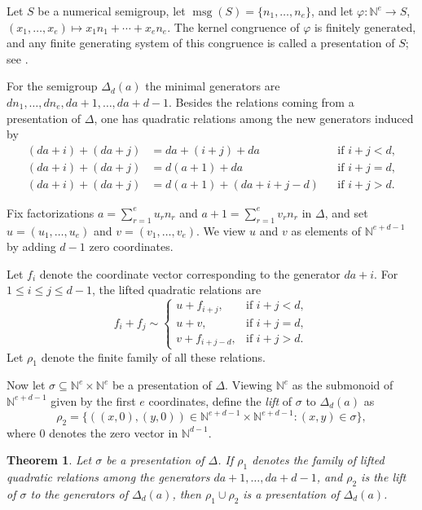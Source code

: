\documentclass[12pt,a4paper]{amsart}
\newtheorem{theorem}{Theorem}[section]
\theoremstyle{definition}
\theoremstyle{remark}
\begin{document}
Let $S$ be a numerical semigroup, let $\operatorname{msg}(S)=\{n_1,\dots,n_e\}$, and let
$\varphi:\mathbb{N}^e\to S$, $(x_1,\dots,x_e)\mapsto x_1n_1+\cdots+x_en_e$.
The kernel congruence of $\varphi$ is finitely generated, and any finite generating system of this congruence is called a presentation of $S$; see \cite[Chapter~7, Section~1]{book}.

For the semigroup $\Delta_d(a)$ the minimal generators are $dn_1,\dots,dn_e,da+1,\dots,da+d-1$.
Besides the relations coming from a presentation of $\Delta$, one has quadratic relations among the new generators induced by
\begin{align*}
(da+i)+(da+j)&=da+(i+j)+da &&\text{if } i+j<d,\\
(da+i)+(da+j)&=d(a+1)+da &&\text{if } i+j=d,\\
(da+i)+(da+j)&=d(a+1)+(da+i+j-d) &&\text{if } i+j>d.
\end{align*}

Fix factorizations $a=\sum_{r=1}^e u_r n_r$ and
$a+1=\sum_{r=1}^e v_r n_r$ in $\Delta$, and set
$u=(u_1,\dots,u_e)$ and $v=(v_1,\dots,v_e)$. We view \(u\) and \(v\) as elements
of \(\mathbb{N}^{e+d-1}\) by adding \(d-1\) zero coordinates.

Let \(f_i\) denote the coordinate vector corresponding to the generator \(da+i\).
For \(1\le i\le j\le d-1\), the lifted quadratic relations are
\[
f_i+f_j \sim
\begin{cases}
u+f_{i+j}, & \text{if } i+j<d,\\
u+v, & \text{if } i+j=d,\\
v+f_{i+j-d}, & \text{if } i+j>d.
\end{cases}
\]
Let \(\rho_1\) denote the finite family of all these relations.

Now let $\sigma\subseteq \mathbb{N}^e\times \mathbb{N}^e$ be a presentation of $\Delta$. Viewing $\mathbb{N}^e$ as the submonoid of $\mathbb{N}^{e+d-1}$ given by the first $e$ coordinates, define the \emph{lift} of $\sigma$ to $\Delta_d(a)$ as
\[
\rho_2=\{((x,0),(y,0))\in \mathbb{N}^{e+d-1}\times \mathbb{N}^{e+d-1} : (x,y)\in \sigma\},
\]
where $0$ denotes the zero vector in $\mathbb{N}^{d-1}$.

\begin{theorem}
Let $\sigma$ be a presentation of $\Delta$. If $\rho_1$ denotes the family of lifted quadratic relations among the generators $da+1,\dots,da+d-1$, and $\rho_2$ is the lift of $\sigma$ to the generators of $\Delta_d(a)$, then $\rho_1\cup \rho_2$ is a presentation of $\Delta_d(a)$.
\end{theorem}
\end{document}
